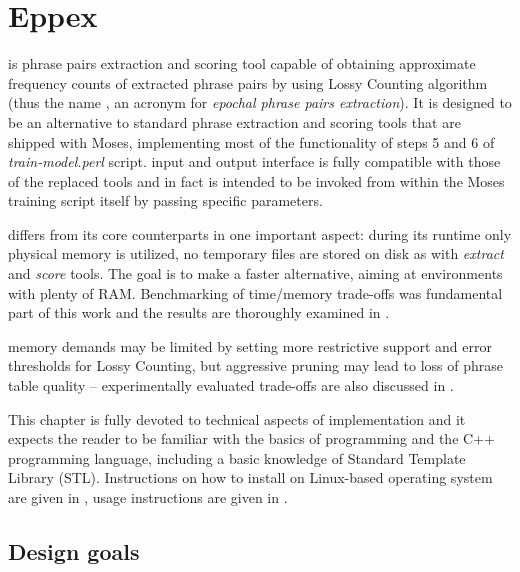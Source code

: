 
\chapter{Eppex}
\label{chap:eppex}

\Eppex{} is phrase pairs extraction and scoring tool capable of obtaining approximate
frequency counts of extracted phrase pairs by using Lossy Counting algorithm
(thus the name \eppex{}, an acronym for \emph{epochal phrase pairs extraction}).
It is designed to be an alternative to standard phrase extraction and scoring tools that
are shipped with Moses, implementing most of the functionality of steps 5 and 6 of
\emph{train-model.perl} script.
\Eppex{} input and output interface is fully compatible with those of the replaced tools
and \eppex{} in fact is intended to be invoked from within the Moses training script itself
by passing specific parameters.

\Eppex{} differs from its core counterparts in one important aspect: during its runtime
only physical memory is utilized, no temporary files are stored on disk as with \emph{extract}
and \emph{score} tools.
The goal is to make \eppex{} a faster alternative, aiming at environments with plenty of RAM.
Benchmarking of time/memory trade-offs was fundamental part of this work and the results are
thoroughly examined in .

\Eppex{} memory demands may be limited by setting more restrictive support and error thresholds
for Lossy Counting, but aggressive pruning may lead to loss of phrase table quality --
experimentally evaluated trade-offs are also discussed in .

This chapter is fully devoted to technical aspects of implementation and it expects the reader
to be familiar with the basics of programming and the C++ programming language, including
a basic knowledge of Standard Template Library (STL).
Instructions on how to install \eppex{} on Linux-based operating system are given in
, usage instructions are given in .

\section{Design goals}

